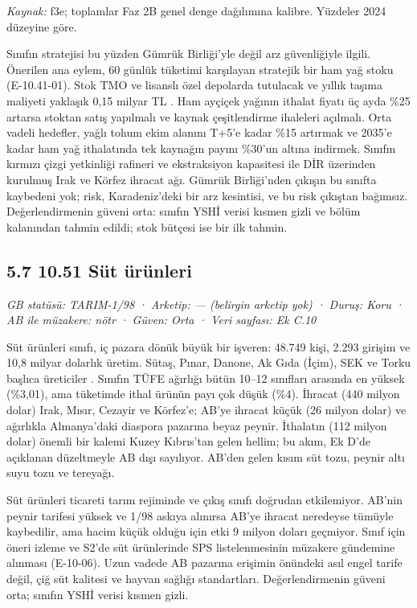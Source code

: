 \endgroup

\emph{Kaynak:} \etiketT{} f3e; toplamlar Faz 2B genel denge dağılımına kalibre. Yüzdeler 2024 düzeyine göre.

Sınıfın stratejisi bu yüzden Gümrük Birliği'yle değil arz güvenliğiyle ilgili. Önerilen ana eylem, 60 günlük tüketimi karşılayan stratejik bir ham yağ stoku (E-10.41-01). Stok TMO ve lisanslı özel depolarda tutulacak ve yıllık taşıma maliyeti yaklaşık 0,15 milyar TL \etiketT{}. Ham ayçiçek yağının ithalat fiyatı üç ayda \%25 artarsa stoktan satış yapılmalı ve kaynak çeşitlendirme ihaleleri açılmalı. Orta vadeli hedefler, yağlı tohum ekim alanını T+5'e kadar \%15 artırmak ve 2035'e kadar ham yağ ithalatında tek kaynağın payını \%30'un altına indirmek. Sınıfın kırmızı çizgi yetkinliği rafineri ve ekstraksiyon kapasitesi ile DİR üzerinden kurulmuş Irak ve Körfez ihracat ağı. Gümrük Birliği'nden çıkışın bu sınıfta kaybedeni yok; risk, Karadeniz'deki bir arz kesintisi, ve bu risk çıkıştan bağımsız. Değerlendirmenin güveni orta: sınıfın YSHİ verisi kısmen gizli ve bölüm kalanından tahmin edildi; stok bütçesi ise bir ilk tahmin.

\hypertarget{nace_kartlar_10-12-57-1051-suxfct-uxfcruxfcnleri}{%
\subsection{5.7 10.51 Süt ürünleri}\label{nace_kartlar_10-12-57-1051-suxfct-uxfcruxfcnleri}}

\emph{GB statüsü: TARIM-1/98 · Arketip: --- (belirgin arketip yok) · Duruş: Koru · AB ile müzakere: nötr · Güven: Orta · Veri sayfası: Ek C.10}

Süt ürünleri sınıfı, iç pazara dönük büyük bir işveren: 48.749 kişi, 2.293 girişim ve 10,8 milyar dolarlık üretim. Sütaş, Pınar, Danone, Ak Gıda (İçim), SEK ve Torku başlıca üreticiler \etiketH{}. Sınıfın TÜFE ağırlığı bütün 10--12 sınıfları arasında en yüksek (\%3,01), ama tüketimde ithal ürünün payı çok düşük (\%4). İhracat (440 milyon dolar) Irak, Mısır, Cezayir ve Körfez'e; AB'ye ihracat küçük (26 milyon dolar) ve ağırlıkla Almanya'daki diaspora pazarına beyaz peynir. İthalatın (112 milyon dolar) önemli bir kalemi Kuzey Kıbrıs'tan gelen hellim; bu akım, Ek D'de açıklanan düzeltmeyle AB dışı sayılıyor. AB'den gelen kısım süt tozu, peynir altı suyu tozu ve tereyağı.

Süt ürünleri ticareti tarım rejiminde ve çıkış sınıfı doğrudan etkilemiyor. AB'nin peynir tarifesi yüksek ve 1/98 askıya alınırsa AB'ye ihracat neredeyse tümüyle kaybedilir, ama hacim küçük olduğu için etki 9 milyon doları geçmiyor. Sınıf için öneri izleme ve S2'de süt ürünlerinde SPS listelenmesinin müzakere gündemine alınması (E-10-06). Uzun vadede AB pazarına erişimin önündeki asıl engel tarife değil, çiğ süt kalitesi ve hayvan sağlığı standartları. Değerlendirmenin güveni orta; sınıfın YSHİ verisi kısmen gizli.

